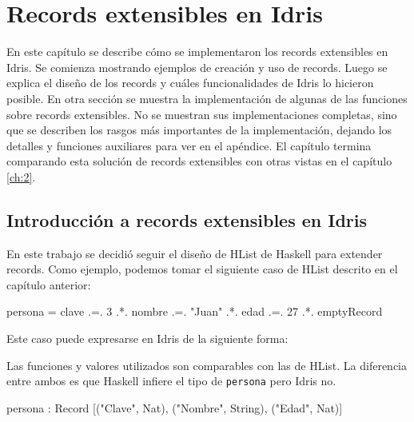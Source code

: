 
\chapter{Records extensibles en Idris}
\label{ch:3}

En este capítulo se describe cómo se implementaron los records extensibles en Idris. Se comienza mostrando ejemplos de creación y uso de records. Luego se explica el diseño de los records y cuáles funcionalidades de Idris lo hicieron posible. En otra sección se muestra la implementación de algunas de las funciones sobre records extensibles. No se muestran sus implementaciones completas, sino que se describen los rasgos más importantes de la implementación, dejando los detalles y funciones auxiliares para ver en el apéndice. El capítulo termina comparando esta solución de records extensibles con otras vistas en el capítulo \ref{ch:2}.

\section{Introducción a records extensibles en Idris}

En este trabajo se decidió seguir el diseño de HList de Haskell para extender records. Como ejemplo, podemos tomar el siguiente caso de HList descrito en el capítulo anterior:

\begin{code}
persona = clave .=. 3
  .*. nombre .=. "Juan"
  .*. edad .=. 27
  .*. emptyRecord
\end{code}

Este caso puede expresarse en Idris de la siguiente forma:


Las funciones y valores utilizados son comparables con las de HList. La diferencia entre ambos es que Haskell infiere el tipo de \texttt{persona} pero Idris no.

\begin{code}
persona : Record [("Clave", Nat), ("Nombre", String),
  ("Edad", Nat)]
\end{code}

